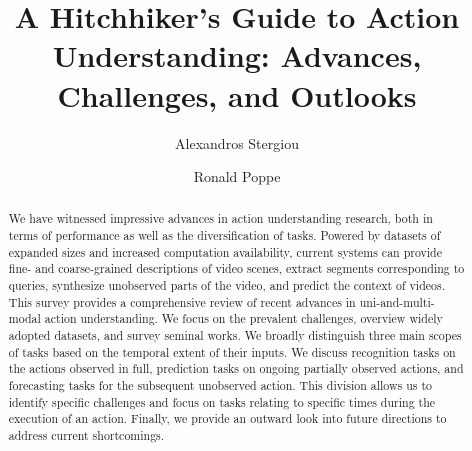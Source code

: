 \documentclass[smallextended,twocolumn,natbib]{svjour3}
\begin{document}
\title{A Hitchhiker's Guide to Action Understanding: Advances, Challenges, and Outlooks}



\author{Alexandros Stergiou \and Ronald Poppe}


\maketitle

\begin{abstract}
We have witnessed impressive advances in action understanding research,  both in terms of performance as well as the diversification of tasks.  Powered by datasets of expanded sizes and increased computation availability, current systems can provide fine- and coarse-grained descriptions of video scenes, extract segments corresponding to queries, synthesize unobserved parts of the video, and predict the context of videos. This survey provides a comprehensive review of recent advances in uni-and-multi-modal action understanding. We focus on the prevalent challenges, overview widely adopted datasets, and survey seminal works. We broadly distinguish three main scopes of tasks based on the temporal extent of their inputs. We discuss recognition tasks on the actions observed in full, prediction tasks on ongoing partially observed actions, and forecasting tasks for the subsequent unobserved action. This division allows us to identify specific challenges and focus on tasks relating to specific times during the execution of an action. Finally, we provide an outward look into future directions to address current shortcomings.

\end{abstract}
\end{document}
